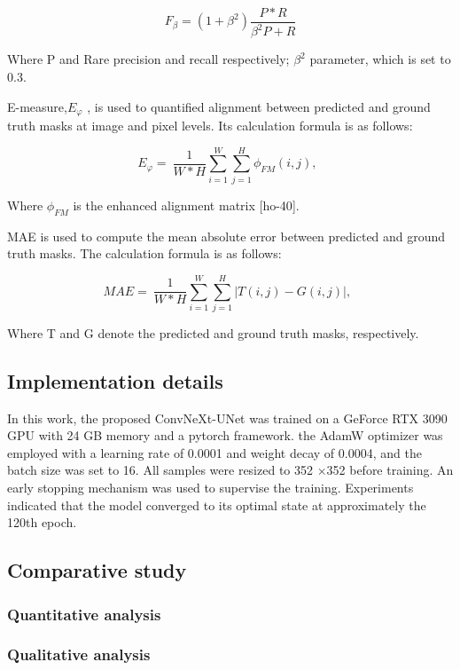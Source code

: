 \[F_{\beta} = \left( 1 + \beta^{2} \right)\frac{P*R}{\beta^{2}P + R}\]

Where P and Rare precision and recall respectively; \(\beta^{2}\)
parameter, which is set to 0.3.

E-measure,\(E_{\varphi}\) , is used to quantified alignment between
predicted and ground truth masks at image and pixel levels. Its
calculation formula is as follows:

\[E_{\varphi} = \ \frac{1}{W*H}\sum_{i = 1}^{W}{\sum_{j = 1}^{H}{\phi_{FM}(i,j),\ \ }}\]

Where \(\phi_{FM}\) is the enhanced alignment matrix {[}ho-40{]}.

MAE is used to compute the mean absolute error between predicted and
ground truth masks. The calculation formula is as follows:

\[MAE = \ \frac{1}{W*H}\sum_{i = 1}^{W}{\sum_{j = 1}^{H}{\left| T(i,j) - G(i,j) \right|,\ \ }}\]

Where T and G denote the predicted and ground truth masks, respectively.

\subsection{Implementation details}\label{implementation-details}

In this work, the proposed ConvNeXt-UNet was trained on a GeForce RTX
3090 GPU with 24 GB memory and a pytorch framework. the AdamW optimizer
was employed with a learning rate of 0.0001 and weight decay of 0.0004,
and the batch size was set to 16. All samples were resized to 352 ×352
before training. An early stopping mechanism was used to supervise the
training. Experiments indicated that the model converged to its optimal
state at approximately the 120th epoch.

\subsection{Comparative study}\label{comparative-study}

\subsubsection{Quantitative analysis}\label{quantitative-analysis}

\subsubsection{Qualitative analysis}\label{qualitative-analysis}

